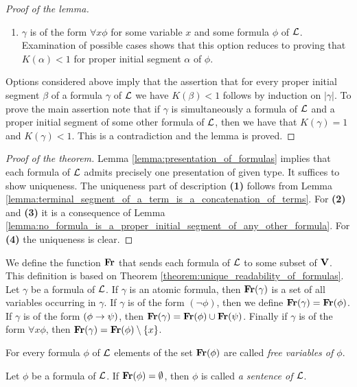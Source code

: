 \begin{proof}[Proof of the lemma]
\begin{enumerate}[label=\textbf{(\arabic*)}, leftmargin=3.0em]
\item $\gamma$ is of the form $\forall x \phi$ for some variable $x$ and some formula $\phi$ of ${\mathcal L}$. Examination of possible cases shows that this option reduces to proving that $K(\alpha) < 1$ for proper initial segment $\alpha$ of $\phi$.
\end{enumerate}
Options considered above imply that the assertion that for every proper initial segment $\beta$ of a formula $\gamma$ of ${\mathcal L}$ we have $K(\beta) < 1$ follows by induction on $|\gamma|$. To prove the main assertion note that if $\gamma$ is simultaneously a formula of ${\mathcal L}$ and a proper initial segment of some other formula of ${\mathcal L}$, then we have that $K(\gamma) = 1$ and $K(\gamma) < 1$. This is a contradiction and the lemma is proved.
\end{proof}

\begin{proof}[Proof of the theorem]
Lemma \ref{lemma:presentation_of_formulas} implies that each formula of ${\mathcal L}$ admits precisely one presentation of given type. It suffices to show uniqueness. The uniqueness part of description \textbf{(1)} follows from Lemma \ref{lemma:terminal_segment_of_a_term_is_a_concatenation_of_terms}. For \textbf{(2)} and \textbf{(3)} it is a consequence of Lemma \ref{lemma:no_formula_is_a_proper_initial_segment_of_any_other_formula}. For \textbf{(4)} the uniqueness is clear.
\end{proof}
\noindent
We define the function $\mathbf{Fr}$ that sends each formula of ${\mathcal L}$ to some subset of $\mathbf{V}$. This definition is based on Theorem \ref{theorem:unique_readability_of_formulas}. Let $\gamma$ be a formula of ${\mathcal L}$. If $\gamma$ is an atomic formula, then $\mathbf{Fr}(\gamma)$ is a set of all variables occurring in $\gamma$. If $\gamma$ is of the form $(\neg \phi)$, then we define $\mathbf{Fr}(\gamma) = \mathbf{Fr}(\phi)$. If $\gamma$ is of the form $(\phi \rightarrow \psi)$, then $\mathbf{Fr}(\gamma) = \mathbf{Fr}(\phi)\cup \mathbf{Fr}(\psi)$. Finally if $\gamma$ is of the form $\forall x\phi$, then $\mathbf{Fr}(\gamma) = \mathbf{Fr}(\phi) \setminus \{x\}$.

\begin{definition}
For every formula $\phi$ of ${\mathcal L}$ elements of the set $\mathbf{Fr}(\phi)$ are called \textit{free variables of $\phi$}.
\end{definition}

\begin{definition}
Let $\phi$ be a formula of ${\mathcal L}$. If $\mathbf{Fr}(\phi)=\emptyset$, then $\phi$ is called \textit{a sentence of ${\mathcal L}$}.
\end{definition}

